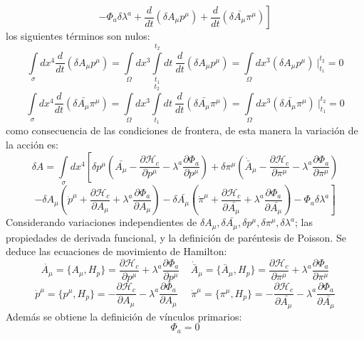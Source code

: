 \documentclass[a4paper,12pt]{article}
\begin{document}
$$\left.-\Phi_a\delta\lambda^a+\frac{d}{dt}(\delta A_\mu p^{\mu})+\frac{d}{dt}(\delta\bar{A_\mu}\pi^{\mu})\right]$$
los siguientes términos son nulos:
\begin{equation}
\int\limits_{\sigma}dx^4\frac{d}{dt}(\delta A_\mu p^{\mu})=\int\limits_{\Omega}dx^3\int\limits_{t_1}^{t_2}dt\ \frac{d}{dt}(\delta A_\mu p^{\mu})=\int\limits_{\Omega}dx^3(\delta A_\mu p^{\mu})\ |_{t_1}^{t_2}=0
\end{equation}
$$\int\limits_{\sigma}dx^4\frac{d}{dt}(\delta\bar{A_\mu}\pi^{\mu})=\int\limits_{\Omega}dx^3\int\limits_{t_1}^{t_2}dt\ \frac{d}{dt}(\delta\bar{A_\mu}\pi^{\mu})=\int\limits_{\Omega}dx^3(\delta\bar{A_\mu}\pi^{\mu})\ |_{t_1}^{t_2}=0$$ 
como consecuencia de las condiciones de frontera, de esta manera la variación de la acción es:
\begin{equation}
\delta A=\int\limits_{\sigma}dx^4\left[\delta p^{\mu}\left(\bar{A_\mu}-\frac{\partial \mathscr{H}_c}{\partial p^{\mu}}-\lambda^a\frac{\partial \Phi_a}{\partial p^\mu}\right)+\delta\pi^{\mu}\left(\dot{\bar{A}}_\mu-\frac{\partial \mathscr{H}_c}{\partial\pi^{\mu}}-\lambda^a\frac{\partial \Phi_a}{\partial \pi^\mu}\right)\right.
\end{equation}
$$-\left.\delta A_\mu\left(\dot p^{\mu}+\frac{\partial \mathscr{H}_c}{\partial A_\mu}+\lambda^a\frac{\partial \Phi_a}{\partial A_\mu}\right)-\delta\bar{A_\mu}\left(\dot\pi^{\mu}+\frac{\partial \mathscr{H}_c}{\partial\bar{A_\mu}}+\lambda^a\frac{\partial \Phi_a}{\partial \bar{A_\mu}}\right)-\Phi_a\delta\lambda^a\right] $$
Considerando variaciones independientes de $\delta A_\mu,\delta \bar{A_\mu},\delta p^\mu,\delta \pi^\mu,\delta \lambda^a$; las propiedades de derivada funcional, y la definición de paréntesis de Poisson. Se deduce las ecuaciones de movimiento de Hamilton:
\begin{equation}
\dot{A_\mu}=\{A_\mu,H_p\}=\frac{\partial \mathscr{H}_c}{\partial p^{\mu}}+\lambda^a\frac{\partial \Phi_a}{\partial p^\mu}\ \ \  \ \ \dot{\bar{A}}_\mu=\{\bar{A}_\mu,H_p\}=\frac{\partial \mathscr{H}_c}{\partial\pi^{\mu}}+\lambda^a\frac{\partial \Phi_a}{\partial \pi^\mu}
\end{equation}
$$\dot p^{\mu}=\{p^{\mu},H_p\}=-\frac{\partial \mathscr{H}_c}{\partial A_\mu}-\lambda^a\frac{\partial \Phi_a}{\partial A_\mu}\ \ \ \ \ \ \dot\pi^{\mu}=\{\pi^{\mu},H_p\}=-\frac{\partial \mathscr{H}_c}{\partial\bar{A_\mu}}-\lambda^a\frac{\partial \Phi_a}{\partial \bar{A_\mu}}$$
Además se obtiene la definición de vínculos primarios:
\begin{equation}
\Phi_a=0 
\end{equation}
\end{document}
